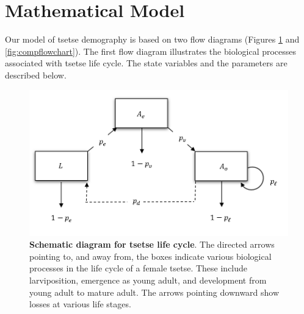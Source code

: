 \documentclass[smallextended]{svjour3}
\begin{document}


\section{Mathematical Model}
Our model of tsetse demography is based on two flow diagrams (Figures \ref{fig:bioflowchart} and \ref{fig:compflowchart}). The first flow diagram illustrates the biological processes associated with tsetse life cycle. The state variables and the parameters are described below.   

\begin{figure}[hbt!]
	\centering
	\includegraphics[width=0.7\linewidth]{Bioflowchart.png}
	\caption{\textbf{Schematic diagram for tsetse life cycle}. The directed arrows pointing to, and away from, the boxes indicate various biological processes in the life cycle of a female tsetse. These include larviposition, emergence as young adult, and development from young adult to mature adult. The arrows pointing downward show losses at various life stages.}
	\label{fig:bioflowchart}
\end{figure}
\end{document}
